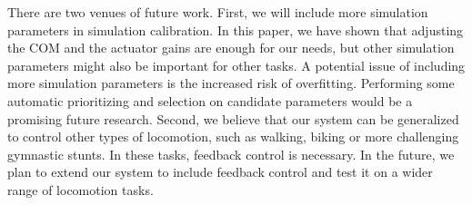 There are two venues of future work. First, we will include more simulation parameters in simulation calibration. In this paper, we have shown that adjusting the COM and the actuator gains are enough for our needs, but other simulation parameters might also be important for other tasks. A potential issue of including more simulation parameters is the increased risk of overfitting. Performing some automatic prioritizing and selection on candidate parameters would be a promising future research. Second, we believe that our system can be generalized to control other types of locomotion, such as walking, biking or more challenging gymnastic stunts. In these tasks, feedback control is necessary. In the future, we plan to extend our system to include feedback control and test it on a wider range of locomotion tasks.
